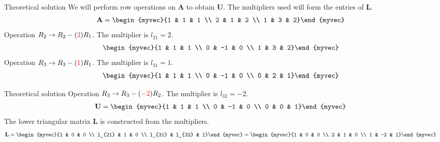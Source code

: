 \documentclass{beamer}
\numberwithin{equation}{section}
\theoremstyle{remark}
\let\vec\mathbf
\begin{document}
	\begin{frame}{Theoretical solution}
		We will perform row operations on $\vec{A}$ to obtain $\vec{U}$. The multipliers used will form the entries of $\vec{L}$.
		\begin{align}
			\vec{A} = \begin{myvec}{1 & 1 & 1 \\ 2 & 1 & 2 \\ 1 & 3 & 2}\end{myvec}
		\end{align}
		Operation $R_2 \to R_2 - (\textcolor{red}{2})R_1$. The multiplier is $l_{21} = 2$.
		\begin{align}
			\begin{myvec}{1 & 1 & 1 \\ 0 & -1 & 0 \\ 1 & 3 & 2}\end{myvec}
		\end{align}
		Operation $R_3 \to R_3 - (\textcolor{red}{1})R_1$. The multiplier is $l_{31} = 1$.
		\begin{align}
			\begin{myvec}{1 & 1 & 1 \\ 0 & -1 & 0 \\ 0 & 2 & 1}\end{myvec}
		\end{align}
		\end{frame}
			
			\begin{frame}{Theoretical solution}
				Operation $R_3 \to R_3 - (\textcolor{red}{-2})R_2$. The multiplier is $l_{32} = -2$.
				\begin{align}
					\vec{U} = \begin{myvec}{1 & 1 & 1 \\ 0 & -1 & 0 \\ 0 & 0 & 1}\end{myvec}
				\end{align}
				The lower triangular matrix $\vec{L}$ is constructed from the multipliers.
				\begin{align}
					\vec{L} = \begin{myvec}{1 & 0 & 0 \\ l_{21} & 1 & 0 \\ l_{31} & l_{32} & 1}\end{myvec} = \begin{myvec}{1 & 0 & 0 \\ 2 & 1 & 0 \\ 1 & -2 & 1}\end{myvec}
				\end{align}
			\end{frame}
			
\end{document}
